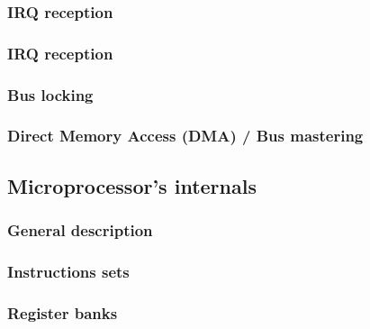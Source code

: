 
\begin{frame}
  \frametitle{IRQ reception}

  \begin{center}
  \end{center}

\end{frame}


\begin{frame}
  \frametitle{IRQ reception}

  \begin{center}
  \end{center}

\end{frame}


\begin{frame}
  \frametitle{Bus locking}

\end{frame}


\begin{frame}
  \frametitle{Direct Memory Access (DMA) / Bus mastering}

\end{frame}

%
%

\subsection{Microprocessor's internals}


\begin{frame}
  \frametitle{General description}

\end{frame}


\begin{frame}
  \frametitle{Instructions sets}

\end{frame}


\begin{frame}
  \frametitle{Register banks}

\end{frame}


